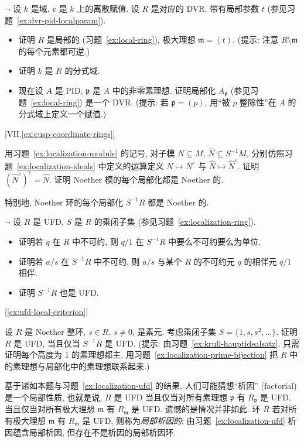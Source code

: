 \begin{prob}
\label{ex:pid-localization-dvr}
$\neg$ 设 $k$ 是域, $v$ 是 $k$ 上的离散赋值. 设 $R$ 是对应的 DVR, 带有局部参数 $t$ (参见习题~\ref{ex:dvr-pid-localparam}).
\begin{itemize}
\item 证明 $R$ 是局部的 (习题~\ref{ex:local-ring}), 极大理想 $\mathfrak{m}=(t)$. (提示: 注意 $R\setminus\mathfrak{m}$ 的每个元素都可逆.)
\item 证明 $k$ 是 $R$ 的分式域.
\item 现在设 $A$ 是 PID, $\mathfrak{p}$ 是 $A$ 中的非零素理想. 证明局部化 $A_\mathfrak{p}$ (参见习题~\ref{ex:local-ring}) 是一个 DVR. (提示: 若 $\mathfrak{p}=(p)$, 用``被 $p$ 整除性''在 $A$ 的分式域上定义一个赋值.)
\end{itemize}
[VII.\ref{ex:cusp-coordinate-rings}]
\end{prob}

\begin{prob}
\label{ex:localization-noeth}
用习题~\ref{ex:localization-module} 的记号, 对子模 $N\subseteq M$, $\widehat N\subseteq S^{-1}M$, 分别仿照习题~\ref{ex:localization-ideals} 中定义的运算定义 $N\mapsto N^e$ 与 $\widehat N\mapsto\widehat N^c$. 证明 $(\widehat N^c)^e=\widehat N$. 证明 Noether 模的每个局部化都是 Noether 的.

\noindent 特别地, Noether 环的每个局部化 $S^{-1}R$ 都是 Noether 的.
\end{prob}

\begin{prob}
\label{ex:localization-ufd}
$\neg$ 设 $R$ 是 UFD, $S$ 是 $R$ 的乘闭子集 (参见习题~\ref{ex:localization-ring}).
\begin{itemize}
\item 证明若 $q$ 在 $R$ 中不可约, 则 $q/1$ 在 $S^{-1}R$ 中要么不可约要么为单位.
\item 证明若 $a/s$ 在 $S^{-1}R$ 中不可约, 则 $a/s$ 与某个 $R$ 的不可约元 $q$ 的相伴元 $q/1$ 相伴.
\item 证明 $S^{-1}R$ 也是 UFD.
\end{itemize}
[\ref{ex:ufd-local-criterion}]
\end{prob}

\begin{prob}
\label{ex:ufd-local-criterion}
设 $R$ 是 Noether 整环, $s\in R$, $s\neq 0$, 是素元. 考虑乘闭子集 $S=\{1,s,s^2,\dots\}$. 证明 $R$ 是 UFD, 当且仅当 $S^{-1}R$ 是 UFD. (提示: 由习题~\ref{ex:krull-hauptidealsatz}, 只需证明每个高度为 $1$ 的素理想都主. 用习题~\ref{ex:localization-prime-bijection} 把 $R$ 中的素理想与局部化中的素理想联系起来.)

\noindent 基于诸如本题与习题~\ref{ex:localization-ufd} 的结果, 人们可能猜想``析因'' (factorial) 是一个局部性质, 也就是说, $R$ 是 UFD 当且仅当对所有素理想 $\mathfrak{p}$ 有 $R_\mathfrak{p}$ 是 UFD, 当且仅当对所有极大理想 $\mathfrak{m}$ 有 $R_\mathfrak{m}$ 是 UFD. 遗憾的是情况并非如此. 环 $R$ 若对所有极大理想 $\mathfrak{m}$ 有 $R_\mathfrak{m}$ 是 UFD, 则称为\emph{局部析因的}; 由习题~\ref{ex:localization-ufd} 析因蕴含局部析因, 但存在不是析因的局部析因环.
\end{prob}

